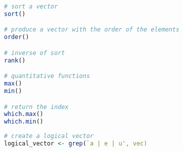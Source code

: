 \documentclass[11pt]{article}
\begin{document}
\begin{lstlisting}[language=R]
# sort a vector
sort()

# produce a vector with the order of the elements
order()

# inverse of sort
rank()

# quantitative functions
max()
min()

# return the index
which.max()
which.min()
\end{lstlisting}



\begin{lstlisting}[language=R]
# create a logical vector
logical_vector <- grep(`a | e | u', vec)
\end{lstlisting}
\end{document}
